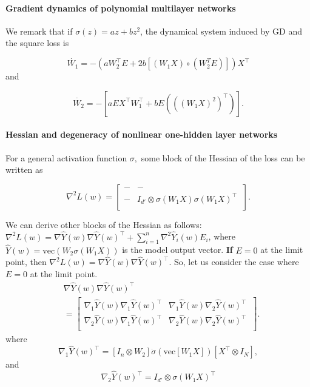 \documentclass[10pt]{article}
\newcommand{\vect}{\mathrm{vec}}
\begin{document}
\paragraph{Gradient dynamics  of polynomial multilayer networks}   We remark that
if  $\sigma(z)=az+bz^2$, the dynamical system induced by GD and the square loss
is 

\begin{equation}
\dot{W_1}=-   (a W_2^\top  E  + 2 b [(W_{1}X) \circ (W_{2}^TE)])
X^\top
\label{PolyDeep21}
\end{equation}
\noindent and

\begin{equation}
\dot{W_2}=- [aE X^\top W_1^\top + bE (((W_{1}X)^{2})^\top )].
\label{PolyDeep31}
\end{equation}

\paragraph{Hessian and degeneracy of  nonlinear one-hidden layer networks}   

For a general activation function $\sigma,$  some block of the Hessian of
the loss can be written as

$$
\nabla^2 L(w) = \begin{bmatrix}- & - \\
- & I_{d'} \otimes \sigma(W_1X) \sigma(W_1X)^\top\ \\
\end{bmatrix}.
$$ 


We can derive other blocks of the Hessian  as
follows:
$\nabla^2 L(w) = \nabla \hat Y(w) \nabla \hat Y(w)^\top + \sum_{i=1}^n
\nabla^2 \hat Y_i(w) E_i$, where $\hat Y(w)=\vect(W_{2}\sigma(W_{1}X))$ is the model output vector.  {\bf If} $E=0$ at the limit point, then
$\nabla^2 L(w) =\nabla \hat Y(w) \nabla \hat Y(w)^\top$. So, let us
consider the case where $E=0$ at the limit point.
\begin{align*}
&\nabla \hat Y(w) \nabla \hat Y(w)^\top 
\\ &= \begin{bmatrix}\nabla_1 \hat Y(w) \nabla_1 \hat Y(w)^\top & \nabla_1 \hat Y(w) \nabla_2 \hat Y(w)^\top \\
\nabla_2 \hat Y(w) \nabla_1 \hat Y(w)^\top & \nabla_2 \hat Y(w) \nabla_2 \hat Y(w)^\top \ \\
\end{bmatrix}.
\end{align*}
where
$$
\nabla_1 \hat Y(w)^\top = [I_{n} \otimes W_2] \dot\sigma(\vect[W_1X]) [X^\top \otimes I_N], 
$$
and
$$
\nabla_2 \hat Y(w)^\top =I_{d'} \otimes  \sigma(W_1X)^\top
$$
\end{document}
